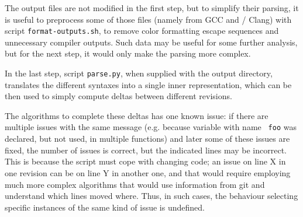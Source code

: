 The output files are not modified in the first step, but to simplify their
parsing, it is useful to preprocess some of those files (namely from GCC and
	/						 Clang) with script
{\tt format-outputs.sh}, to remove color formatting escape sequences and
unnecessary compiler outputs.  Such data may be useful for some further
analysis, but for the next step, it would only make the parsing more complex.

In the last step, script {\tt parse.py}, when supplied with the output
directory, translates the different syntaxes into a single inner
representation, which can be then used to simply compute deltas between
different revisions.

The algorithms to complete these deltas has one known issue: if there are
multiple issues with the same message (e.g. because variable with name {\tt
				       foo} was declared, but not used, in
				       multiple functions) and later some of
these issues are fixed, the number of issues is correct, but the indicated
lines may be incorrect. This is because the script must cope with changing
code; an issue on line X in one revision can be on line Y in another one, and
that would require employing much more complex algorithms that would use
information from git and understand which lines moved where. Thus, in such
cases, the behaviour selecting specific instances of the same kind of issue is
undefined.


%
%
%

